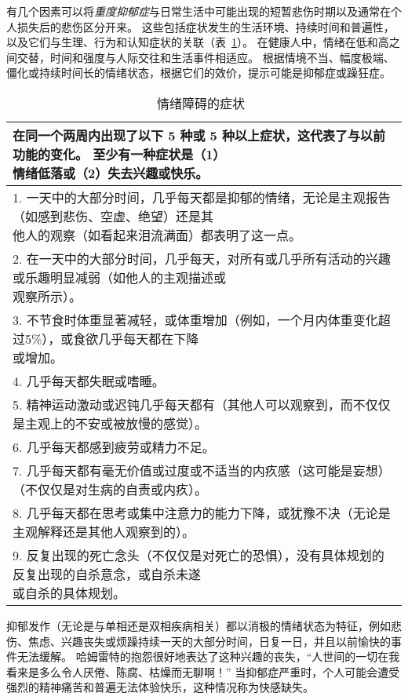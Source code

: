 有几个因素可以将\textit{重度抑郁症}与日常生活中可能出现的短暂悲伤时期以及通常在个人损失后的悲伤区分开来。
这些包括症状发生的生活环境、持续时间和普遍性，以及它们与生理、行为和认知症状的关联（表~\ref{tab:61_1}）。
在健康人中，情绪在低和高之间交替，时间和强度与人际交往和生活事件相适应。
根据情境不当、幅度极端、僵化或持续时间长的情绪状态，根据它们的效价，提示可能是抑郁症或躁狂症。


\begin{table}[htbp]
	\caption{情绪障碍的症状~\cite{vahia2013diagnostic} \label{tab:61_1}}
	\begin{tabular}{l}
		\toprule
		\makecell[l]{在同一个两周内出现了以下 5 种或 5 种以上症状，这代表了与以前功能的变化。
			至少有一种症状是（1） \\情绪低落或（2）失去兴趣或快乐。} \\
		\midrule
		\makecell[l]{1. 一天中的大部分时间，几乎每天都是抑郁的情绪，无论是主观报告（如感到悲伤、空虚、绝望）还是其\\他人的观察（如看起来泪流满面）都表明了这一点。}\\
		\makecell[l]{2. 在一天中的大部分时间，几乎每天，对所有或几乎所有活动的兴趣或乐趣明显减弱（如他人的主观描述或\\观察所示）。}\\
		\makecell[l]{3. 不节食时体重显著减轻，或体重增加（例如，一个月内体重变化超过5\%），或食欲几乎每天都在下降\\或增加。}\\
		4. 几乎每天都失眠或嗜睡。\\
		5. 精神运动激动或迟钝几乎每天都有（其他人可以观察到，而不仅仅是主观上的不安或被放慢的感觉）。  \\
		6. 几乎每天都感到疲劳或精力不足。\\
		7. 几乎每天都有毫无价值或过度或不适当的内疚感（这可能是妄想）（不仅仅是对生病的自责或内疚）。\\
		8. 几乎每天都在思考或集中注意力的能力下降，或犹豫不决（无论是主观解释还是其他人观察到的）。\\
		\makecell[l]{9. 反复出现的死亡念头（不仅仅是对死亡的恐惧），没有具体规划的反复出现的自杀意念，或自杀未遂\\或自杀的具体规划。} \\
		\bottomrule
	\end{tabular}
\end{table}


抑郁发作（无论是与单相还是双相疾病相关）都以消极的情绪状态为特征，例如悲伤、焦虑、兴趣丧失或烦躁持续一天的大部分时间，日复一日，并且以前愉快的事件无法缓解。
哈姆雷特的抱怨很好地表达了这种兴趣的丧失，“人世间的一切在我看来是多么令人厌倦、陈腐、枯燥而无聊啊！” 
当抑郁症严重时，个人可能会遭受强烈的精神痛苦和普遍无法体验快乐，这种情况称为快感缺失。



